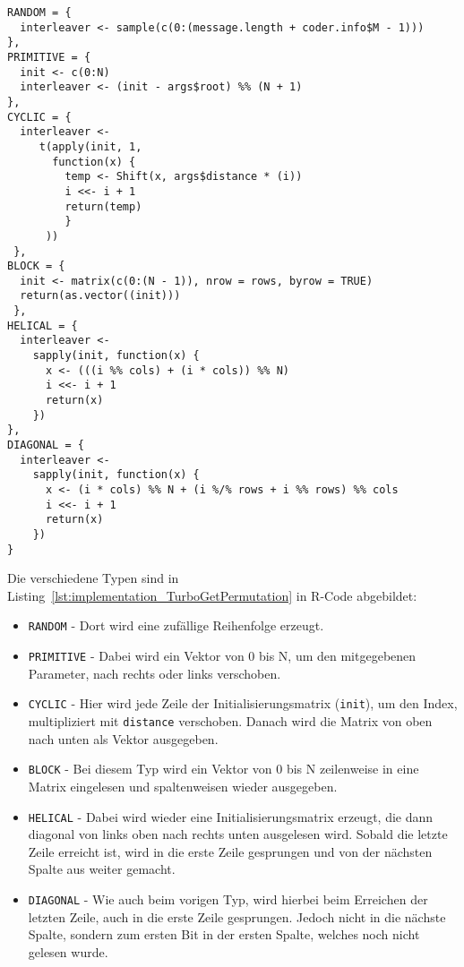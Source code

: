\begin{lstlisting}[caption=Implementierung von \texttt{TurboGetPermutation}, label={lst:implementation_TurboGetPermutation}, float=!th]
RANDOM = {
  interleaver <- sample(c(0:(message.length + coder.info$M - 1)))
},
PRIMITIVE = {
  init <- c(0:N)
  interleaver <- (init - args$root) %% (N + 1)
},
CYCLIC = {
  interleaver <-
     t(apply(init, 1,
       function(x) {
         temp <- Shift(x, args$distance * (i))
         i <<- i + 1
         return(temp)
         }
      ))
 },
BLOCK = {
  init <- matrix(c(0:(N - 1)), nrow = rows, byrow = TRUE)
  return(as.vector((init)))
 },
HELICAL = {
  interleaver <-
    sapply(init, function(x) {
      x <- (((i %% cols) + (i * cols)) %% N)
      i <<- i + 1
      return(x)
    })
},
DIAGONAL = {
  interleaver <-
    sapply(init, function(x) {
      x <- (i * cols) %% N + (i %/% rows + i %% rows) %% cols
      i <<- i + 1
      return(x)
    })
}
\end{lstlisting}

Die verschiedene Typen sind in Listing~\ref{lst:implementation_TurboGetPermutation} in R-Code abgebildet:

\begin{itemize}
\item \texttt{RANDOM} - Dort wird eine zufällige Reihenfolge erzeugt.
\item \texttt{PRIMITIVE} - Dabei wird ein Vektor von 0 bis N, um den mitgegebenen Parameter, nach rechts oder links verschoben.
\item \texttt{CYCLIC} - Hier wird jede Zeile der Initialisierungsmatrix (\texttt{init}), um den Index, multipliziert mit \texttt{distance} verschoben. Danach wird die Matrix von oben nach unten als Vektor ausgegeben.
\item \texttt{BLOCK} - Bei diesem Typ wird ein Vektor von 0 bis N zeilenweise in eine Matrix eingelesen und spaltenweisen wieder ausgegeben.
\item \texttt{HELICAL} - Dabei wird wieder eine Initialisierungsmatrix erzeugt, die dann diagonal von links oben nach rechts unten ausgelesen wird. Sobald die letzte Zeile erreicht ist, wird in die erste Zeile gesprungen und von der nächsten Spalte aus weiter gemacht.
\item \texttt{DIAGONAL} - Wie auch beim vorigen Typ, wird hierbei beim Erreichen der letzten Zeile, auch in die erste Zeile gesprungen. Jedoch nicht in die nächste Spalte, sondern zum ersten Bit in der ersten Spalte, welches noch nicht gelesen wurde.
\end{itemize}

